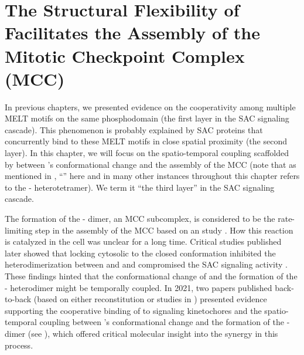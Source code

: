 \chapter{The Structural Flexibility of  Facilitates the Assembly of the Mitotic Checkpoint Complex (MCC)}
\label{chpt:4}

In previous chapters, we presented evidence on the cooperativity among multiple MELT motifs on the same  phosphodomain (the first layer in the SAC signaling cascade). This phenomenon is probably explained by SAC proteins that concurrently bind to these MELT motifs in close spatial proximity (the second layer). In this chapter, we will focus on the spatio-temporal coupling scaffolded by  between 's conformational change and the assembly of the MCC \cite{BUB1-CDC20-MAD1,Tripartite} (note that as mentioned in , ``'' here and in many other instances throughout this chapter refers to the - heterotetramer). We term it ``the third layer'' in the SAC signaling cascade. %

The formation of the - dimer, an MCC subcomplex, is considered to be the rate-limiting step in the assembly of the MCC based on an  study \cite{Faesen2017}. How this reaction is catalyzed in the cell was unclear for a long time. Critical studies published later showed that locking cytosolic  to the closed conformation inhibited the heterodimerization between  and  and compromised the SAC signaling activity \cite{Ma+Poon2016,Ma+Poon2018,Kim2018}. These findings hinted that the conformational change of  and the formation of the - heterodimer might be temporally coupled. In 2021, two papers published back-to-back (based on either  reconstitution \cite{BUB1-CDC20-MAD1} or studies in  \cite{Tripartite}) presented evidence supporting the cooperative binding of  to signaling kinetochores and the spatio-temporal coupling between 's conformational change and the formation of the - dimer (see ), which offered critical molecular insight into the synergy in this process.

